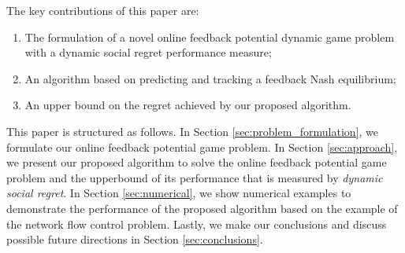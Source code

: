 \documentclass[letterpaper, 10 pt, conference]{ieeeconf}  %
\begin{document}
The key contributions of this paper are:
\begin{enumerate}
    \item The formulation of a novel online feedback potential dynamic game problem with a dynamic social regret performance measure;
    \item An algorithm based on predicting and tracking a feedback Nash equilibrium;
    \item An upper bound on the regret achieved by our proposed algorithm.
\end{enumerate}



This paper is structured as follows.
In Section \ref{sec:problem_formulation}, we formulate our online feedback potential game problem. In Section \ref{sec:approach}, we present our proposed algorithm to solve the online feedback potential game problem and the upperbound of its performance that is measured by \emph{dynamic social regret}. In Section \ref{sec:numerical}, we show numerical examples to demonstrate the performance of the proposed algorithm based on the example of the network flow control problem. Lastly, we make our conclusions and discuss possible future directions in Section \ref{sec:conclusions}.
\end{document}
